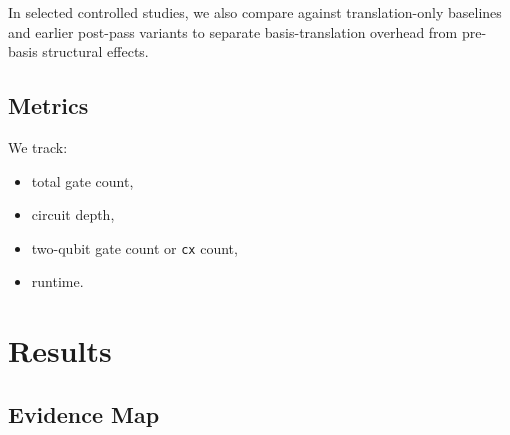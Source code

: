 \documentclass[11pt]{article}
\begin{document}
In selected controlled studies, we also compare against translation-only baselines and earlier post-pass variants to separate basis-translation overhead from pre-basis structural effects.

\subsection{Metrics}

We track:
\begin{itemize}[leftmargin=1.5em]
    \item total gate count,
    \item circuit depth,
    \item two-qubit gate count or \texttt{cx} count,
    \item runtime.
\end{itemize}

\section{Results}
\label{sec:results}

\subsection{Evidence Map}
\end{document}
